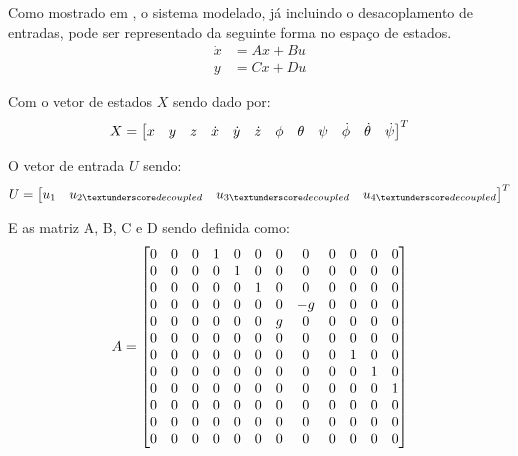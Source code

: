 Como mostrado em \cite[p.~63]{Balas2007}, o sistema modelado, já incluindo o desacoplamento de entradas, pode ser representado da seguinte forma no espaço de estados.
\begin{align} \label{eq:space_state_equation_quadcopter}
	\dot{x} &= Ax + Bu \nonumber \\
	y		&= Cx + Du
\end{align}

Com o vetor de estados $X$ sendo dado por:
\begin{equation*}
X=
\left[ \begin{array}{@{}*{12}{c}@{}}
     x & y & z & \dot{x} & \dot{y} & \dot{z} & \phi & \theta & \psi & \dot{\phi} & \dot{\theta} & \dot{\psi}\\
\end{array} \right]^T
\end{equation*}

O vetor de entrada $U$ sendo:
\[ 
	U =
	\begin{bmatrix}
		u_1 & 
		u_{2\textunderscore decoupled} &
		u_{3\textunderscore decoupled} &
		u_{4\textunderscore decoupled}
	\end{bmatrix}^T
\]

E as matriz A, B, C e D sendo definida como:
\begin{equation*}
A =
\left[ \begin{array}{@{}*{12}{c}@{}}
     0 & 0 & 0 & 1 & 0 & 0 & 0 & 0  & 0 & 0 & 0 & 0 \\
     0 & 0 & 0 & 0 & 1 & 0 & 0 & 0  & 0 & 0 & 0 & 0 \\
     0 & 0 & 0 & 0 & 0 & 1 & 0 & 0  & 0 & 0 & 0 & 0 \\
     0 & 0 & 0 & 0 & 0 & 0 & 0 & -g & 0 & 0 & 0 & 0 \\
     0 & 0 & 0 & 0 & 0 & 0 & g & 0  & 0 & 0 & 0 & 0 \\
     0 & 0 & 0 & 0 & 0 & 0 & 0 & 0  & 0 & 0 & 0 & 0 \\
     0 & 0 & 0 & 0 & 0 & 0 & 0 & 0  & 0 & 1 & 0 & 0 \\
     0 & 0 & 0 & 0 & 0 & 0 & 0 & 0  & 0 & 0 & 1 & 0 \\
     0 & 0 & 0 & 0 & 0 & 0 & 0 & 0  & 0 & 0 & 0 & 1 \\
     0 & 0 & 0 & 0 & 0 & 0 & 0 & 0  & 0 & 0 & 0 & 0 \\
     0 & 0 & 0 & 0 & 0 & 0 & 0 & 0  & 0 & 0 & 0 & 0 \\
     0 & 0 & 0 & 0 & 0 & 0 & 0 & 0  & 0 & 0 & 0 & 0 \\
\end{array}\right]
\end{equation*}

